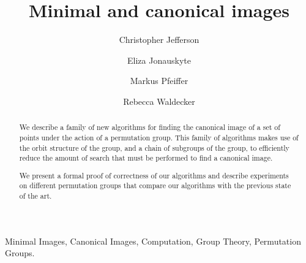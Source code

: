 \documentclass[preprint,12pt]{elsarticle}
\begin{document}
\begin{frontmatter}

\title{Minimal and canonical images}

\author{Christopher Jefferson}

\author{Eliza Jonauskyte}

\author{Markus Pfeiffer}
\address{University of St~Andrews\\School of Computer Science\\North Haugh\\St Andrews\\KY16 9SX\\Scotland}

\author{Rebecca Waldecker}
\address{Martin-Luther-Universit\"at Halle-Wittenberg\\Institut f\"ur Mathematik\\06099 Halle\\Germany}


\begin{abstract}
We describe a family of new algorithms for finding the canonical image of a set
of points under the action of a permutation group. This family of algorithms
makes use of the orbit structure of the group, and a chain of subgroups of the
group, to efficiently reduce the amount of search that must be performed to
find a canonical image.

We present a formal proof of correctness of our algorithms and describe experiments
on different permutation groups that compare our algorithms with the previous
state of the art.
\end{abstract}

\begin{keyword}
  Minimal Images, Canonical Images, Computation, Group Theory, Permutation Groups.
\end{keyword}
\end{frontmatter}
\end{document}
